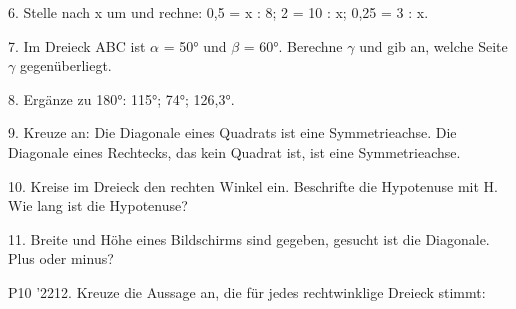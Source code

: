 \documentclass[11pt]{article}
\begin{document}
\begin{pfaufg}{}{6.}{}
Stelle nach x um und rechne: 0,5 = x : 8; 2 = 10 : x; 0,25 = 3 : x.
\end{pfaufg}
\begin{pfaufg}{}{7.}{}
Im Dreieck ABC ist $\alpha$ = 50° und $\beta$ = 60°. Berechne $\gamma$ und gib an, welche Seite $\gamma$ gegenüberliegt.
\end{pfaufg}
\begin{pfaufg}{}{8.}{}
Ergänze zu 180°: 115°; 74°; 126,3°.
\end{pfaufg}
\begin{pfaufg}{}{9.}{}
Kreuze an: Die Diagonale eines Quadrats ist eine Symmetrieachse. Die Diagonale eines Rechtecks, das kein Quadrat ist, ist eine Symmetrieachse.
\end{pfaufg}
\pfgruppe{}
\begin{pfaufg}{}{10.}{}
Kreise im Dreieck den rechten Winkel ein. Beschrifte die Hypotenuse mit H. Wie lang ist die Hypotenuse?
\par\smallskip\noindent {}\par
\par\noindent \leerfeld[cm] \par
{}
\end{pfaufg}
\begin{pfaufg}{}{11.}{}
Breite und Höhe eines Bildschirms sind gegeben, gesucht ist die Diagonale. Plus oder minus? 
\end{pfaufg}
\pfgruppe{}
\begin{pfaufg}{P10 ’22}{12.}{}
Kreuze die Aussage an, die für jedes rechtwinklige Dreieck stimmt:
\end{pfaufg}
\end{document}
